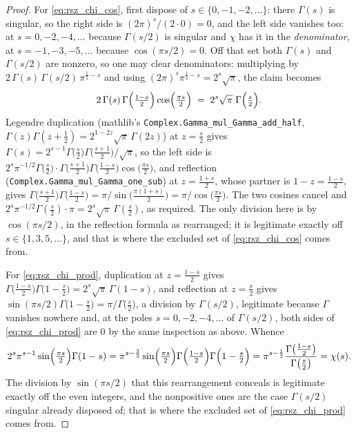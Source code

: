 \begin{proof}
\leanok
For \eqref{eq:rsz_chi_cos}, first dispose of $s\in\{0,-1,-2,\dots\}$: there $\Gamma(s)$ is
singular, so the right side is $(2\pi)^{s}/(2\cdot0)=0$, and the left side vanishes too:
at $s=0,-2,-4,\dots$ because $\Gamma(s/2)$ is singular and $\chi$ has it in the
\emph{denominator}, at $s=-1,-3,-5,\dots$ because $\cos(\pi s/2)=0$.  Off that set both
$\Gamma(s)$ and $\Gamma(s/2)$ are nonzero, so one may clear denominators: multiplying by
$2\,\Gamma(s)\,\Gamma(s/2)\,\pi^{\frac12-s}$ and using $(2\pi)^{s}\pi^{\frac12-s}
=2^{s}\sqrt\pi$, the claim becomes
\[
  2\,\Gamma(s)\,\Gamma\Bigl(\tfrac{1-s}2\Bigr)\cos\Bigl(\tfrac{\pi s}2\Bigr)
  \;=\;2^{s}\sqrt\pi\;\Gamma\Bigl(\tfrac s2\Bigr).
\]
Legendre duplication (mathlib's
\texttt{Complex.Gamma\_mul\_Gamma\_add\_half}, $\Gamma(z)\Gamma(z+\tfrac12)
=2^{1-2z}\sqrt\pi\,\Gamma(2z)$) at $z=\tfrac s2$ gives
$\Gamma(s)=2^{s-1}\Gamma\bigl(\tfrac s2\bigr)\Gamma\bigl(\tfrac{s+1}2\bigr)/\sqrt\pi$, so the
left side is
$2^{s}\pi^{-1/2}\Gamma\bigl(\tfrac s2\bigr)\cdot
\Gamma\bigl(\tfrac{s+1}2\bigr)\Gamma\bigl(\tfrac{1-s}2\bigr)\cos\bigl(\tfrac{\pi s}2\bigr)$,
and reflection (\texttt{Complex.Gamma\_mul\_Gamma\_one\_sub}) at $z=\tfrac{1+s}2$, whose
partner is $1-z=\tfrac{1-s}2$, gives
$\Gamma\bigl(\tfrac{s+1}2\bigr)\Gamma\bigl(\tfrac{1-s}2\bigr)
=\pi/\sin\bigl(\tfrac{\pi(1+s)}2\bigr)=\pi/\cos\bigl(\tfrac{\pi s}2\bigr)$.  The two cosines
cancel and $2^{s}\pi^{-1/2}\Gamma(\tfrac s2)\cdot\pi=2^{s}\sqrt\pi\,\Gamma(\tfrac s2)$, as
required.  The only division here is by $\cos(\pi s/2)$, in the reflection formula as
rearranged; it is legitimate exactly off $s\in\{1,3,5,\dots\}$, and that is where the
excluded set of \eqref{eq:rsz_chi_cos} comes from.

For \eqref{eq:rsz_chi_prod}, duplication at $z=\tfrac{1-s}2$ gives
$\Gamma\bigl(\tfrac{1-s}2\bigr)\Gamma\bigl(1-\tfrac s2\bigr)=2^{s}\sqrt\pi\,\Gamma(1-s)$,
and reflection at $z=\tfrac s2$ gives $\sin(\pi s/2)\Gamma\bigl(1-\tfrac s2\bigr)
=\pi/\Gamma\bigl(\tfrac s2\bigr)$, a division by $\Gamma(s/2)$, legitimate because
$\Gamma$ vanishes nowhere and, at the poles $s=0,-2,-4,\dots$ of $\Gamma(s/2)$, both sides
of \eqref{eq:rsz_chi_prod} are $0$ by the same inspection as above.  Whence
\[
  2^{s}\pi^{s-1}\sin\Bigl(\tfrac{\pi s}2\Bigr)\Gamma(1-s)
   =\pi^{s-\frac32}\sin\Bigl(\tfrac{\pi s}2\Bigr)
     \Gamma\Bigl(\tfrac{1-s}2\Bigr)\Gamma\Bigl(1-\tfrac s2\Bigr)
   =\pi^{s-\frac12}\frac{\Gamma\bigl(\tfrac{1-s}2\bigr)}{\Gamma\bigl(\tfrac s2\bigr)}
   =\chi(s).
\]
The division by $\sin(\pi s/2)$ that this rearrangement conceals is legitimate exactly off the
even integers, and the nonpositive ones are the case $\Gamma(s/2)$ singular already disposed
of; that is where the excluded set of \eqref{eq:rsz_chi_prod} comes from.


\end{proof}
